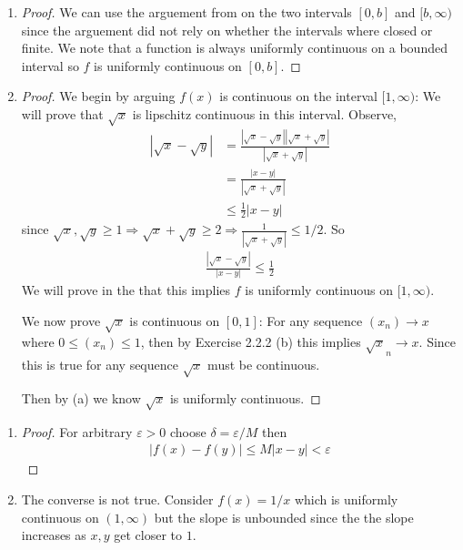 \begin{enumerate}[label=(\alph*)]
    \item 
    \begin{proof}
        We can use the arguement from  on the two intervals $[0,b]$ and 
        $[b,\infty)$ since the arguement did not rely on whether the intervals 
        where closed or finite. We note that a function is always uniformly
        continuous on a bounded interval so $f$ is uniformly continuous on 
        $[0,b]$.
    \end{proof}

    \item
    \begin{proof}
        We begin by arguing $f(x)$ is continuous on the interval $[1,\infty)$:
        We will prove that $\sqrt x$ is lipschitz continuous in this interval.
        Observe,
        \begin{align*}
            |\sqrt x - \sqrt y| &= \frac{|\sqrt x - \sqrt y||\sqrt x + \sqrt y|}{|\sqrt x + \sqrt y|} \\
            &= \frac{|x-y|}{|\sqrt x + \sqrt y|} \\
            &\leq \frac{1}{2}|x-y|
        \end{align*}
        since $\sqrt x, \sqrt y \geq 1 \Rightarrow \sqrt x+\sqrt y \geq 2 
        \Rightarrow \frac{1}{|\sqrt x + \sqrt y|} \leq 1/2$. So
        \begin{align*}
            \frac{|\sqrt x - \sqrt y|}{|x-y|} \leq \frac{1}{2}
        \end{align*}
        We will prove in the  that this implies $f$ is 
        uniformly continuous on $[1,\infty)$.

        We now prove $\sqrt x$ is continuous on $[0,1]$:
        For any sequence $(x_n) \rightarrow x$ where $0 \leq (x_n)\leq 1$, 
        then by Exercise 2.2.2 (b) this implies $\sqrt x_n \rightarrow x$.
        Since this is true for any sequence $\sqrt x$ must be continuous.

        Then by (a) we know $\sqrt x$ is uniformly continuous.
    \end{proof}
\end{enumerate}

\begin{enumerate}[label=(\alph*)]
    \item 
    \begin{proof}
        For arbitrary $\varepsilon>0$ choose $\delta = \varepsilon/M$ then 
        \begin{align*}
            |f(x)-f(y)| \leq M |x-y| < \varepsilon
        \end{align*}
    \end{proof}

    \item
    The converse is not true. 
    Consider $f(x)=1/x$ which is uniformly continuous on $(1,\infty)$
    but the slope is unbounded since the the slope increases as $x,y$ get 
    closer to $1$. 
\end{enumerate}


